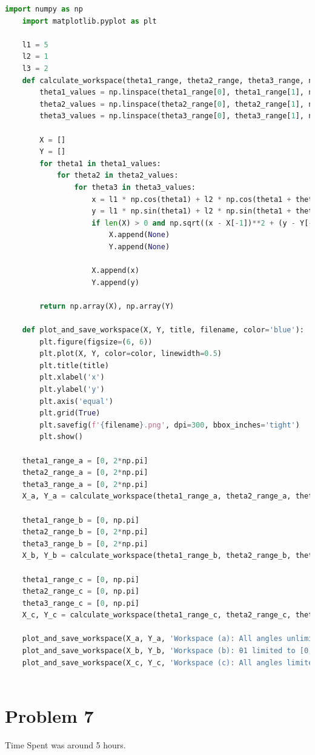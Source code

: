 \documentclass[12pt]{article}
\begin{document}
\begin{lstlisting}[language=Python]
    import numpy as np
    import matplotlib.pyplot as plt
    
    l1 = 5
    l2 = 1
    l3 = 2
    def calculate_workspace(theta1_range, theta2_range, theta3_range, num_points=25):
        theta1_values = np.linspace(theta1_range[0], theta1_range[1], num_points)
        theta2_values = np.linspace(theta2_range[0], theta2_range[1], num_points)
        theta3_values = np.linspace(theta3_range[0], theta3_range[1], num_points)
        
        X = []
        Y = []
        for theta1 in theta1_values:
            for theta2 in theta2_values:
                for theta3 in theta3_values:
                    x = l1 * np.cos(theta1) + l2 * np.cos(theta1 + theta2) + l3 * np.cos(theta1 + theta2 + theta3)
                    y = l1 * np.sin(theta1) + l2 * np.sin(theta1 + theta2) + l3 * np.sin(theta1 + theta2 + theta3)                
                    if len(X) > 0 and np.sqrt((x - X[-1])**2 + (y - Y[-1])**2) > 1.0:
                        X.append(None)  
                        Y.append(None)  
                    
                    X.append(x)
                    Y.append(y)
        
        return np.array(X), np.array(Y)
    
    def plot_and_save_workspace(X, Y, title, filename, color='blue'):
        plt.figure(figsize=(6, 6))
        plt.plot(X, Y, color=color, linewidth=0.5)
        plt.title(title)
        plt.xlabel('x')
        plt.ylabel('y')
        plt.axis('equal')
        plt.grid(True)
        plt.savefig(f'{filename}.png', dpi=300, bbox_inches='tight')
        plt.show()
    
    theta1_range_a = [0, 2*np.pi]
    theta2_range_a = [0, 2*np.pi]
    theta3_range_a = [0, 2*np.pi]
    X_a, Y_a = calculate_workspace(theta1_range_a, theta2_range_a, theta3_range_a)
    
    theta1_range_b = [0, np.pi]
    theta2_range_b = [0, 2*np.pi]
    theta3_range_b = [0, 2*np.pi]
    X_b, Y_b = calculate_workspace(theta1_range_b, theta2_range_b, theta3_range_b)
    
    theta1_range_c = [0, np.pi]
    theta2_range_c = [0, np.pi]
    theta3_range_c = [0, np.pi]
    X_c, Y_c = calculate_workspace(theta1_range_c, theta2_range_c, theta3_range_c)
    
    plot_and_save_workspace(X_a, Y_a, 'Workspace (a): All angles unlimited', 'workspace_case_a', color='blue')
    plot_and_save_workspace(X_b, Y_b, 'Workspace (b): θ1 limited to [0, π]', 'workspace_case_b', color='green')
    plot_and_save_workspace(X_c, Y_c, 'Workspace (c): All angles limited to [0, π]', 'workspace_case_c', color='red')
    
    \end{lstlisting}
\newpage
\section{Problem 7}
\item Time Spent was around 5 hours.
\end{document}
